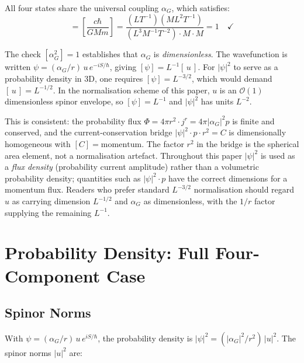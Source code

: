 \documentclass[11pt,a4paper]{article}
\theoremstyle{definition}
\theoremstyle{remark}
\begin{document}
	All four states share the universal coupling $\alpha_G$, which satisfies:
	\begin{equation}
		[\alpha_G^2] = \left[\frac{c\hbar}{GMm}\right] = \frac{(LT^{-1})(ML^2T^{-1})}{(L^3M^{-1}T^{-2})\cdot M\cdot M} = 1 \quad\checkmark
	\end{equation}

	\begin{tcolorbox}[enhanced,colback=yellow!8,colframe=black,
	  title={\textbf{Note on the dimensions of $\alpha_G$ and $\psi$}},
	  fonttitle=\bfseries,breakable]
	The check $[\alpha_G^2] = 1$ establishes that $\alpha_G$ is \emph{dimensionless}.
	The wavefunction is written $\psi = (\alpha_G/r)\,u\,e^{-iS/\hbar}$, giving
	$[\psi] = L^{-1}[\,u\,]$.  For $|\psi|^2$ to serve as a probability density in 3D,
	one requires $[\psi] = L^{-3/2}$, which would demand $[\,u\,] = L^{-1/2}$.  In the
	normalisation scheme of this paper, $u$ is an $\mathcal{O}(1)$ dimensionless spinor
	envelope, so $[\psi] = L^{-1}$ and $|\psi|^2$ has units $L^{-2}$.

	This is consistent: the probability flux $\Phi = 4\pi r^2 \cdot j^r = 4\pi|\alpha_G|^2 p$
	is finite and conserved, and the current-conservation bridge
	$|\psi|^2 \cdot p \cdot r^2 = C$ is dimensionally homogeneous with $[C] = \mathrm{momentum}$.
	The factor $r^2$ in the bridge is the spherical area element, not a normalisation
	artefact.  Throughout this paper $|\psi|^2$ is used as a \emph{flux density}
	(probability current amplitude) rather than a volumetric probability density;
	quantities such as $|\psi|^2 \cdot p$ have the correct dimensions for a momentum flux.
	Readers who prefer standard $L^{-3/2}$ normalisation should regard $u$ as carrying
	dimension $L^{-1/2}$ and $\alpha_G$ as dimensionless, with the $1/r$ factor supplying
	the remaining $L^{-1}$.
	\end{tcolorbox}
	
	\section{Probability Density: Full Four-Component Case}
	
	\subsection{Spinor Norms}
	
	With $\psi = (\alpha_G/r)\,u\,e^{iS/\hbar}$, the probability density is $|\psi|^2 = (|\alpha_G|^2/r^2)\,|u|^2$.  The spinor norms $|u|^2$ are:
	
\end{document}
